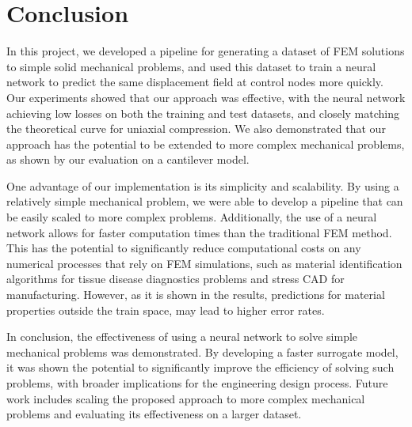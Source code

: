 \documentclass[oneside,a4paper,english,links]{amca}
\begin{document}

\section{Conclusion}
In this project, we developed a pipeline for generating a dataset of FEM solutions to simple solid mechanical problems, and used this dataset to train a neural network to predict the same displacement field at control nodes more quickly.
%
Our experiments showed that our approach was effective, with the neural network achieving low losses on both the training and test datasets, and closely matching the theoretical curve for uniaxial compression. We also demonstrated that our approach has the potential to be extended to more complex mechanical problems, as shown by our evaluation on a cantilever model. 

One advantage of our implementation is its simplicity and scalability. By using a relatively simple mechanical problem, we were able to develop a pipeline that can be easily scaled to more complex problems. Additionally, the use of a neural network allows for faster computation times than the traditional FEM method. This has the potential to significantly reduce computational costs on any numerical processes that rely on FEM simulations, such as material identification algorithms for tissue disease diagnostics problems and stress CAD for manufacturing. However, as it is shown in the results, predictions for material properties outside the train space, may lead to higher error rates. 


In conclusion, the effectiveness of using a neural network to solve simple mechanical problems was demonstrated. By developing a faster surrogate model, it was shown the potential to significantly improve the efficiency of solving such problems, with broader implications for the engineering design process. Future work includes scaling the proposed approach to more complex mechanical problems and evaluating its effectiveness on a larger dataset.


\end{document}
